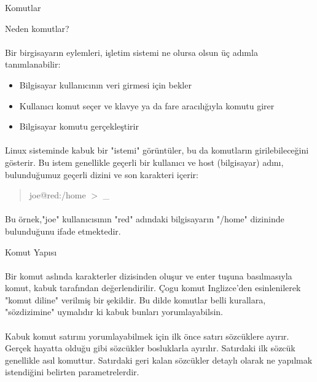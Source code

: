 \documentclass[10pt,a5paper]{book}
\begin{document}
\begin{section}{Komutlar}
\begin{subsection}{Neden komutlar?}
\paragraph{}{Bir birgisayarın eylemleri, işletim sistemi ne olursa olsun üç adımla tanımlanabilir:
\begin{itemize}
 \item Bilgisayar kullanıcının veri girmesi için bekler
 \item Kullanıcı komut seçer ve klavye ya da fare aracılığıyla komutu girer
 \item Bilgisayar komutu gerçekleştirir
\end{itemize}}
\paragraph{}{Linux sisteminde kabuk bir "istemi" görüntüler, bu da komutların girilebileceğini gösterir. Bu istem genellikle geçerli bir kullanıcı ve host (bilgisayar) adını, bulunduğumuz geçerli dizini ve son karakteri içerir:}
\begin{quotation}{joe@red:/home $>$ \_}
\end{quotation}
\paragraph{}{Bu örnek,"joe" kullanıcısının "red" adındaki bilgisayarın "/home" dizininde bulunduğunu ifade etmektedir.}
\end{subsection}
\begin{subsection}{Komut Yapısı}
\paragraph{}{Bir komut aslında karakterler dizisinden oluşur ve enter tuşuna basılmasıyla komut, kabuk tarafından değerlendirilir. Çogu komut Inglizce'den esinlenilerek "komut diline" verilmiş bir şekildir. Bu dilde komutlar belli kurallara, "sözdizimine" uymalıdır ki kabuk bunları yorumlayabilsin.}
\paragraph{}{Kabuk komut satırını yorumlayabilmek için ilk önce satırı sözcüklere ayırır. Gerçek hayatta olduğu gibi sözcükler bosluklarla ayırılır. Satırdaki ilk sözcük genellikle asıl komuttur. Satırdaki geri kalan sözcükler detaylı olarak ne yapılmak istendiğini belirten parametrelerdir.}

\end{subsection}
\end{section}
\end{document}
